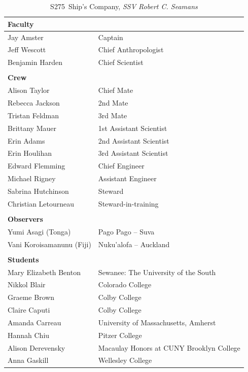 \documentclass[letterpaper,11pt]{article}
\newcommand{\cruiseID}{S275}
\begin{document}
\begin{table}[ht]
 \caption{\label{shipCompany} \cruiseID\ Ship's Company, \textit{SSV Robert C. Seamans}}\\
\\
\begin{tabular}{p{8cm} l}
 
  \vspace*{0.2cm}
  \textbf{Faculty} \\
  \hline
  Jay Amster & Captain\\
  Jeff Wescott & Chief Anthropologist\\
  Benjamin Harden & Chief Scientist\\
\\
  \textbf{Crew}\\
  \hline
  Alison Taylor  & Chief Mate\\
  Rebecca Jackson & 2nd Mate\\
  Tristan Feldman & 3rd Mate\\
  Brittany Mauer & 1st Assistant Scientist\\
  Erin Adams & 2nd Assistant Scientist\\
  Erin Houlihan & 3rd Assistant Scientist\\
  Edward Flemming & Chief Engineer\\
  Michael Rigney & Assistant Engineer\\
  Sabrina Hutchinson & Steward\\
  Christian Letourneau & Steward-in-training\\
\\
  \textbf{Observers}\\
  \hline
  Yumi Asagi (Tonga) & Pago Pago -- Suva\\
  Vani Koroisamanunu (Fiji) & Nuku'alofa -- Auckland\\
\\
  \textbf{Students}\\
  \hline
  Mary Elizabeth Benton &	Sewanee: The University of the South \\
  Nikkol Blair	& Colorado College \\
  Graeme Brown&	Colby College \\
  Claire Caputi &	Colby College\\
  Amanda Carreau&	University of Massachusetts, Amherst\\
  Hannah Chiu &	Pitzer College\\
  Alison Derevensky&	Macaulay Honors at CUNY Brooklyn College\\
  Anna Gaskill	&Wellesley College\\

\end{tabular}
\end{table}
\end{document}

